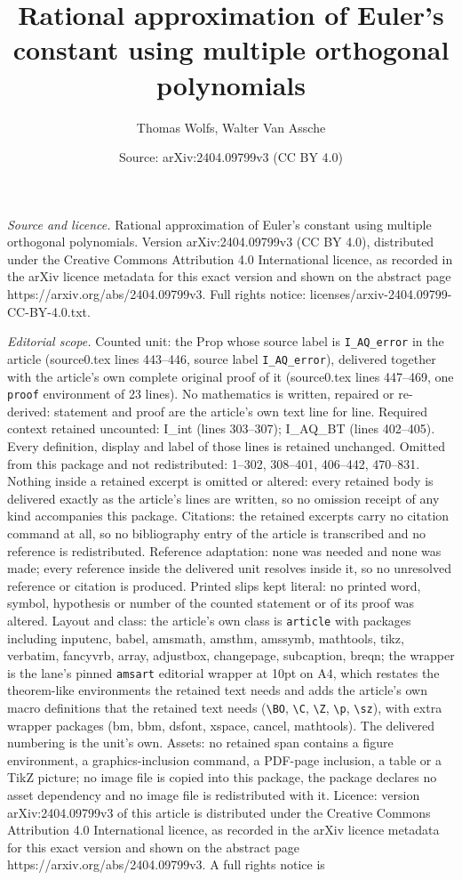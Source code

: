 \documentclass[10pt,a4paper]{amsart}
\title[Rational approximation of Euler's constant using multiple or]{Rational approximation of Euler's constant using multiple orthogonal polynomials}
\author{Thomas Wolfs, Walter Van Assche}
\date{Source: arXiv:2404.09799v3 (CC BY 4.0)}
\begin{document}
\maketitle

\noindent\emph{Source and licence.} Rational approximation of Euler's constant using multiple orthogonal polynomials. Version arXiv:2404.09799v3 (CC BY 4.0), distributed under the Creative Commons Attribution 4.0 International licence, as recorded in the arXiv licence metadata for this exact version and shown on the abstract page https://arxiv.org/abs/2404.09799v3. Full rights notice: licenses/arxiv-2404.09799-CC-BY-4.0.txt.\par\smallskip

\noindent\textit{Editorial scope.} Counted unit: the Prop whose source label is \texttt{I\_AQ\_error} in the article (source0.tex lines 443--446, source label \texttt{I\_AQ\_error}), delivered together with the article's own complete original proof of it (source0.tex lines 447--469, one \texttt{proof} environment of 23 lines). No mathematics is written, repaired or re-derived: statement and proof are the article's own text line for line. Required context retained uncounted: I\_int (lines 303--307); I\_AQ\_BT (lines 402--405). Every definition, display and label of those lines is retained unchanged. Omitted from this package and not redistributed: 1--302, 308--401, 406--442, 470--831. Nothing inside a retained excerpt is omitted or altered: every retained body is delivered exactly as the article's lines are written, so no omission receipt of any kind accompanies this package. Citations: the retained excerpts carry no citation command at all, so no bibliography entry of the article is transcribed and no reference is redistributed. Reference adaptation: none was needed and none was made; every reference inside the delivered unit resolves inside it, so no unresolved reference or citation is produced. Printed slips kept literal: no printed word, symbol, hypothesis or number of the counted statement or of its proof was altered. Layout and class: the article's own class is \texttt{article} with packages including inputenc, babel, amsmath, amsthm, amssymb, mathtools, tikz, verbatim, fancyvrb, array, adjustbox, changepage, subcaption, breqn; the wrapper is the lane's pinned \texttt{amsart} editorial wrapper at 10pt on A4, which restates the theorem-like environments the retained text needs and adds the article's own macro definitions that the retained text needs (\texttt{\textbackslash BO}, \texttt{\textbackslash C}, \texttt{\textbackslash Z}, \texttt{\textbackslash p}, \texttt{\textbackslash sz}), with extra wrapper packages (bm, bbm, dsfont, xspace, cancel, mathtools). The delivered numbering is the unit's own. Assets: no retained span contains a figure environment, a graphics-inclusion command, a PDF-page inclusion, a table or a TikZ picture; no image file is copied into this package, the package declares no asset dependency and no image file is redistributed with it. Licence: version arXiv:2404.09799v3 of this article is distributed under the Creative Commons Attribution 4.0 International licence, as recorded in the arXiv licence metadata for this exact version and shown on the abstract page https://arxiv.org/abs/2404.09799v3. A full rights notice is 
\end{document}
